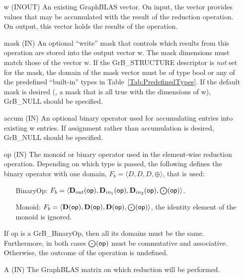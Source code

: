 \begin{itemize}[leftmargin=1.1in]
    \item[{\sf w}]    ({\sf INOUT}) An existing GraphBLAS vector.  On input,
    the vector provides values that may be accumulated with the result of the
    reduction operation.  On output, this vector holds the results of the
    operation.

    \item[{\sf mask}] ({\sf IN}) An optional ``write'' mask that controls which
    results from this operation are stored into the output vector {\sf w}. The 
    mask dimensions must match those of the vector {\sf w}. If the 
    {\sf GrB\_STRUCTURE} descriptor is {\em not} set for the mask, the domain of the
    {\sf mask} vector must be of type {\sf bool} or any of the predefined 
    ``built-in'' types in Table~\ref{Tab:PredefinedTypes}.  If the default
    mask is desired (\ie, a mask that is all {\sf true} with the dimensions of {\sf w}), 
    {\sf GrB\_NULL} should be specified.

    \item[{\sf accum}] ({\sf IN}) An optional binary operator used for accumulating
    entries into existing {\sf w} entries. If assignment rather than accumulation is
    desired, {\sf GrB\_NULL} should be specified.

    \item[{\sf op}]    ({\sf IN}) The monoid or binary operator 
    used in the element-wise reduction operation.  Depending on which type is
    passed, the following defines the binary operator with one domain, $F_b=\langle D,D,D,\oplus \rangle$, that is used:
    \begin{itemize}[leftmargin=1.1in]
    \item[BinaryOp:] $F_b = \langle \mbox{$\mathbf{D}_{out}$}({\sf op}), \mbox{$\mathbf{D}_{in_{1}}$}({\sf op}),
    \mbox{$\mathbf{D}_{in_{2}}$}({\sf op}),\bold{\bigodot}({\sf op})\rangle$.  
    \item[Monoid:] $F_b = \langle \bold{D}({\sf op}), \bold{D}({\sf op}),
    \bold{D}({\sf op}),\bold{\bigodot}({\sf op})\rangle$,
    the identity element of the monoid is ignored. 
    \end{itemize}
    If {\sf op} is a {\sf GrB\_BinaryOp}, then all its domains must be the same.
    Furthermore, in both cases $\bold{\bigodot}({\sf op})$ must be commutative and associative. Otherwise, the outcome of the operation is undefined.
    
    \item[{\sf A}]     ({\sf IN}) The GraphBLAS matrix on which
	    reduction will be performed.


\end{itemize}
